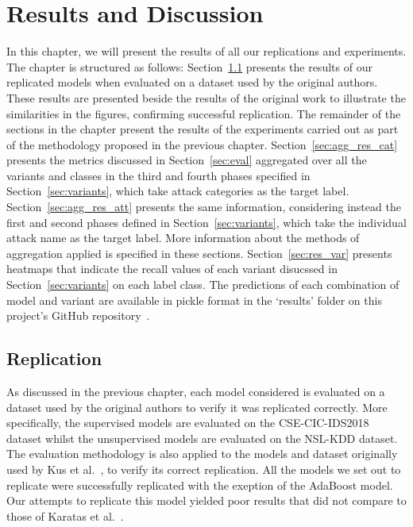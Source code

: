 \graphicspath{{content/chapters/4_results/figures/}}

\chapter{Results and Discussion}%
\label{chp:results}

In this chapter, we will present the results of all our replications and
experiments. The chapter is structured as follows:
Section~\ref{sec:replication} presents the results of our replicated models
when evaluated on a dataset used by the original authors. These results are
presented beside the results of the original work to illustrate the
similarities in the figures, confirming successful replication. The remainder
of the sections in the chapter present the results of the experiments carried
out as part of the methodology proposed in the previous chapter.
Section~\ref{sec:agg_res_cat} presents the metrics discussed in
Section~\ref{sec:eval} aggregated over all the variants and classes in the
third and fourth phases specified in Section~\ref{sec:variants}, which take
attack categories as the target label. Section~\ref{sec:agg_res_att} presents
the same information, considering instead the first and second phases defined
in Section~\ref{sec:variants}, which take the individual attack name as the
target label. More information about the methods of aggregation applied is
specified in these sections. Section~\ref{sec:res_var} presents heatmaps that
indicate the recall values of each variant disucssed in
Section~\ref{sec:variants} on each label class. The predictions of each
combination of model and variant are available in pickle format in the
`results' folder on this project's GitHub repository~\cite{repo}.

\section{Replication}%
\label{sec:replication}

As discussed in the previous chapter, each model considered is evaluated on a
dataset used by the original authors to verify it was replicated correctly.
More specifically, the supervised models are evaluated on the CSE-CIC-IDS2018
dataset whilst the unsupervised models are evaluated on the NSL-KDD dataset.
The evaluation methodology is also applied to the models and dataset originally
used by Kus et al.~\cite{Kus}, to verify its correct replication. All the
models we set out to replicate were successfully replicated with the exeption
of the AdaBoost model. Our attempts to replicate this model yielded poor
results that did not compare to those of Karatas et al.~\cite{Karatas}.

